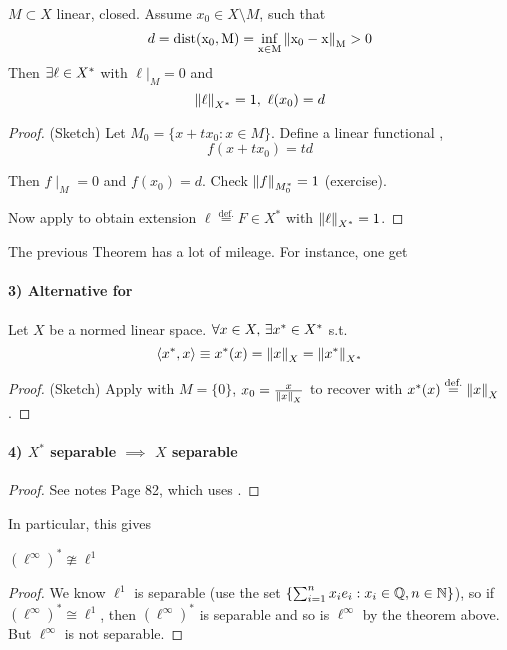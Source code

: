 \documentclass{article}
\begin{document}
\begin{theorem}
\label{analog of Urysohn}
$M \subset X$ linear, closed. Assume $x_0 \in X\setminus M$, such that  
$$d = \rm{dist} (x_0, M) = \inf_{x \in M} \left\|{x_0-x}\right\|_M >0$$
Then $\exists \ell \in {X}^*$ with $\ell|_M=0$ and  
$$\left\|{\ell}\right\|_{{X}^*}=1, \  \ell(x_0)=d$$
\end{theorem}

\begin{proof}
(Sketch)
Let $M_0=\{x+t x_0: x\in M\}$. Define a linear functional , 
$$f(x+tx_0)=td$$

Then $f\mid_M=0$ and $f(x_0)=d$. Check $\left\|{f}\right\|_{M_0^*}=1$ (exercise).  

Now apply  to obtain extension $\ell \overset{\text{def.}}{=}F \in X^*$ with $\left\|{\ell}\right\|_{X^*}=1$.
\end{proof}

The previous Theorem  has a lot of mileage. For instance, one get  

\paragraph{3) Alternative for }  
\begin{proposition}
    Let $X$ be a normed linear space. $\forall x\in X,\,\exists x^*\in {X}^*$ s.t. $$\left<{{x}^*},{x}\right>\equiv{x}^*(x)=\left\|{x}\right\|_X=\left\|{{x}^*}\right\|_{{X}^*}$$
\end{proposition}
\begin{proof}
    (Sketch) Apply  with $M = \{0\}$, $x_0=\frac{x}{\left\|{x}\right\|_X}$ to recover  with $x^*(x) \stackrel{\text{def.}}{=} \left\|{x}\right\|_X$.
\end{proof}

\paragraph{4) $X^*$ separable $\implies$ $X$ separable}  
\begin{proof}
    See notes Page 82, which uses .
\end{proof}

In particular, this gives  

\begin{corollary}
    $(\ell^{\infty})^* \ncong \ell^1$
\end{corollary}
\begin{proof}
    We know $\ell^1$ is separable (use the set $\{\sum_{i=1}^n x_i e_i: x_i \in \mathbb{Q}, n \in \mathbb{N}\}$), so if $(\ell^{\infty})^* \cong \ell^1$, then $(\ell^{\infty})^*$ is separable and so is $\ell^{\infty}$ by the theorem above. But $\ell^{\infty}$ is not separable.
\end{proof} 
\end{document}
